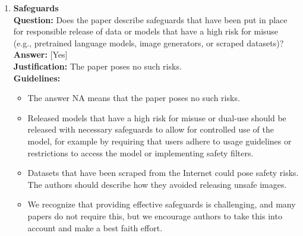 \begin{enumerate}
\item \textbf{Safeguards}\\
\textbf{Question:} Does the paper describe safeguards that have been put in place for responsible release of data or models that have a high risk for misuse (e.g., pretrained language models, image generators, or scraped datasets)?\\
\textbf{Answer:} [Yes]\\
\textbf{Justification:} The paper poses no such risks.\\
\textbf{Guidelines:}
\begin{itemize}
\item The answer NA means that the paper poses no such risks.
\item Released models that have a high risk for misuse or dual-use should be released with necessary safeguards to allow for controlled use of the model, for example by requiring that users adhere to usage guidelines or restrictions to access the model or implementing safety filters.
\item Datasets that have been scraped from the Internet could pose safety risks. The authors should describe how they avoided releasing unsafe images.
\item We recognize that providing effective safeguards is challenging, and many papers do not require this, but we encourage authors to take this into account and make a best faith effort.
\end{itemize}


\end{enumerate}
